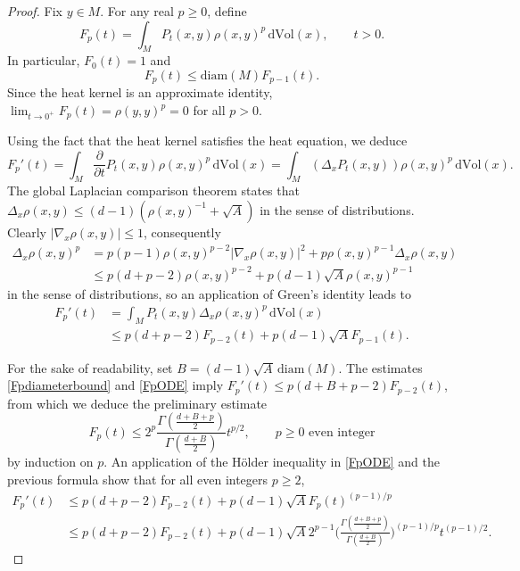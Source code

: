 \documentclass[11pt,a4paper]{article}
\theoremstyle{definition}
\begin{document}
\begin{proof} Fix $y \in M$. For any real $p \ge 0$, define
\[ F_p(t) = \int_M P_t(x,y) \rho (x,y)^p \, \mathrm{d}\mathrm{Vol}(x), \qquad t>0. \]
In particular, $F_0(t)=1$ and
\begin{equation}\label{Fpdiameterbound}
F_p(t) \le \mathrm{diam}(M) F_{p-1}(t).
\end{equation}
Since the heat kernel is an approximate identity, $\lim_{t \to 0^+} F_p(t)=\rho (y,y)^p=0$ for all $p>0$.

Using the fact that the heat kernel satisfies the heat equation, we deduce
\[ F_p'(t) = \int_M \frac{\partial}{\partial t} P_t(x,y) \rho(x,y)^p \, \mathrm{d}\mathrm{Vol}(x) = \int_M (\Delta_x P_t(x,y)) \rho (x,y)^p \, \mathrm{d}\mathrm{Vol}(x). \]
The global Laplacian comparison theorem \cite{WE} states that $\Delta_x \rho (x,y) \le (d-1)(\rho(x,y)^{-1}+\sqrt{A})$ in the sense of distributions. Clearly $|\nabla_x \rho(x,y)| \le 1$, consequently
\[ \begin{split} \Delta_x \rho(x,y)^p &=p(p-1)\rho(x,y)^{p-2} |\nabla_x \rho (x,y)|^2 + p\rho(x,y)^{p-1} \Delta_x \rho (x,y) \\ &\le p (d+p-2) \rho(x,y)^{p-2} + p (d-1)\sqrt{A} \rho(x,y)^{p-1} \end{split} \]
in the sense of distributions, so an application of Green's identity leads to
\begin{equation}\label{FpODE}
\begin{split} F_p'(t) &=\int_M P_t(x,y) \Delta_x \rho (x,y)^p \, \mathrm{d}\mathrm{Vol}(x) \\ &\le p(d+p-2) F_{p-2}(t) + p(d-1)\sqrt{A} F_{p-1}(t). \end{split}
\end{equation}

For the sake of readability, set $B=(d-1) \sqrt{A} \, \mathrm{diam}(M)$. The estimates \eqref{Fpdiameterbound} and \eqref{FpODE} imply $F_p'(t) \le p(d+B+p-2)F_{p-2}(t)$, from which we deduce the preliminary estimate
\[ F_p(t) \le 2^p \frac{\Gamma \left( \frac{d+B+p}{2} \right)}{\Gamma \left( \frac{d+B}{2} \right)} t^{p/2}, \qquad p \ge 0 \textrm{ even integer} \]
by induction on $p$. An application of the H\"older inequality in \eqref{FpODE} and the previous formula show that for all even integers $p \ge 2$,
\begin{equation}\label{FpODE2}
\begin{split} F_p'(t) &\le p(d+p-2) F_{p-2}(t) + p(d-1)\sqrt{A} F_p (t)^{(p-1)/p} \\ &\le p(d+p-2) F_{p-2}(t) + p (d-1) \sqrt{A} 2^{p-1} \Bigg( \frac{\Gamma \left( \frac{d+B+p}{2} \right)}{\Gamma \left( \frac{d+B}{2} \right)} \Bigg)^{(p-1)/p} t^{(p-1)/2} . \end{split}
\end{equation}


\end{proof}
\end{document}

